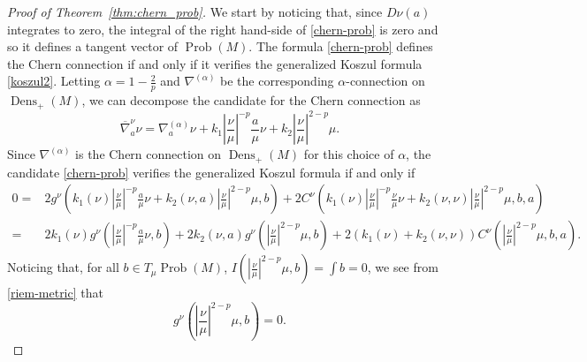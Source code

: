 \documentclass[11pt]{amsart}
\theoremstyle{definition}
\newcommand{\Abs}[1]{\left|#1\right|}
\newcommand{\Prob}{\operatorname{Prob}(M)}
\newcommand{\Dens}{\operatorname{Dens}_+(M)}
\newcommand{\nablabar}{\overline{\nabla}}
\begin{document}
\begin{proof}[Proof of Theorem~\ref{thm:chern_prob}]
We start by noticing that, since $D\nu(a)$ integrates to zero, the integral of the right hand-side of \eqref{chern-prob} is zero and so it defines a tangent vector of $\Prob$. The formula \eqref{chern-prob} defines the Chern connection if and only if it verifies the generalized Koszul formula \eqref{koszul2}.
Letting $\alpha=1-\frac{2}{p}$ and $\nabla^{(\alpha)}$ be the corresponding $\alpha$-connection on $\Dens$, we can decompose the candidate for the Chern connection as
$$\nablabar^\nu_a\nu=\nabla^{(\alpha)}_a\nu + k_1\Abs{\frac{\nu}{\mu}}^{-p}\frac{a}{\mu}\nu + k_2\Abs{\frac{\nu}{\mu}}^{2-p}\mu.$$
Since $\nabla^{(\alpha)}$ is the Chern connection on $\Dens$ for this choice of $\alpha$, the candidate \eqref{chern-prob} verifies the generalized Koszul formula if and only if
\begin{equation}\label{koszul3}
\begin{aligned}
0=&2g^\nu\left(k_1(\nu)\Abs{\frac{\nu}{\mu}}^{-p}\frac{a}{\mu}\nu+ k_2(\nu,a)\Abs{\frac{\nu}{\mu}}^{2-p}\mu,b\right)  + 2C^\nu\left(k_1(\nu)\Abs{\frac{\nu}{\mu}}^{-p}\frac{\nu}{\mu}\nu +k_2(\nu,\nu)\Abs{\frac{\nu}{\mu}}^{2-p}\mu , b, a\right)\\
=&2k_1(\nu)g^\nu\left(\Abs{\frac{\nu}{\mu}}^{-p}\frac{a}{\mu}\nu, b\right)  + 2k_2(\nu,a)g^\nu\left(\Abs{\frac{\nu}{\mu}}^{2-p}\mu,b\right) + 2(k_1(\nu)+k_2(\nu,\nu)) C^\nu\left(\Abs{\frac{\nu}{\mu}}^{2-p}\mu,b,a\right).
\end{aligned}
\end{equation}
Noticing that, for all $b\in T_\mu\Prob$, $I(|\frac{\nu}{\mu}|^{2-p}\mu, b)=\int b = 0$, we see from \eqref{riem-metric} that 
$$g^\nu\left(\Abs{\frac{\nu}{\mu}}^{2-p}\mu, b\right)=0.$$ 

\end{proof}
\end{document}
